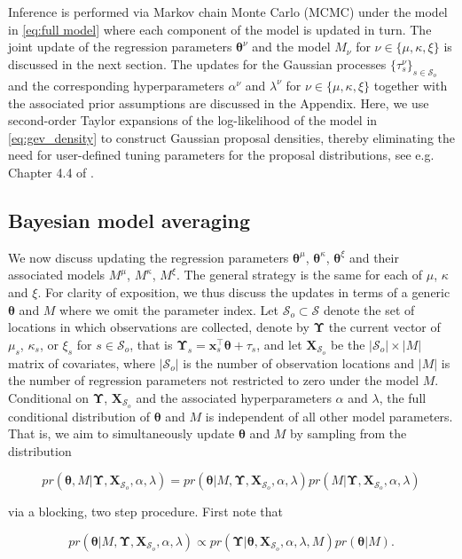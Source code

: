 \documentclass[11pt,english]{article}
\newcommand{\bs}[1]{\boldsymbol{#1}}
\newcommand{\mc}[1]{\mathcal{#1}}
\newcommand{\bl}{\begin{linenomath}}
\newcommand{\el}{\end{linenomath}}
\begin{document}
Inference is performed via Markov chain Monte Carlo (MCMC) under the model in \eqref{eq:full model} where each component of the model is updated in turn.  The joint update of the regression parameters $\bs{\theta}^\nu$ and the model $M_\nu$ for $\nu \in \{ \mu, \kappa, \xi\}$ is discussed in the next section.  The updates for the Gaussian processes $\{ \tau^\nu_s\}_{s \in \mathcal{S}_o}$ and the corresponding hyperparameters $\alpha^{\nu}$ and $\lambda^{\nu}$ for $\nu \in \{ \mu, \kappa, \xi\}$ together with the associated prior assumptions are discussed in the Appendix.  Here, we use second-order Taylor expansions of the log-likelihood of the model in \eqref{eq:gev_density} to construct Gaussian proposal densities, thereby eliminating the need for user-defined tuning parameters for the proposal distributions, see e.g. Chapter 4.4 of \cite{RueHeld2005}.  

\subsection{Bayesian model averaging}\label{sec:bma}

We now discuss updating the regression parameters $\bs{\theta}^{\mu}$, $\bs{\theta}^\kappa$, $\bs{\theta}^{\xi}$ and their associated models $M^\mu$, $M^\kappa$, $M^\xi$.  The general strategy is the same for each of $\mu$, $\kappa$ and $\xi$.  For clarity of exposition, we thus discuss the updates in terms of a generic $\bs{\theta}$ and $M$ where we omit the parameter index.  Let $\mc{S}_o\subset \mc{S}$ denote the set of locations in which observations are collected, denote by $\bs{\Upsilon}$ the current vector of $\mu_s$, $\kappa_s$, or $\xi_s$ for $s \in \mc{S}_o$, that is $\bs{\Upsilon}_s =  \bs{x}_s^\top \bs{\theta} + \tau_s $, and let $\bs{X}_{\mc{S}_o}$ be the $|\mc{S}_o| \times |M|$ matrix of covariates, where $|\mc{S}_o|$ is the number of observation locations and $|M|$ is the number of regression parameters not restricted to zero under the model $M$.   Conditional on $\bs{\Upsilon}$, $\bs{X}_{\mc{S}_o}$ and the associated hyperparameters $\alpha$ and $\lambda$, the full conditional distribution of $\bs{\theta}$ and $M$ is independent of all other model parameters. That is, we aim to simultaneously update $\bs{\theta}$ and $M$ by sampling from the distribution
\bl\[
pr(\bs{\theta}, M| \bs{\Upsilon}, \bs{X}_{\mc{S}_o}, \alpha, \lambda) = pr(\bs{\theta}|M, \bs{\Upsilon}, \bs{X}_{\mc{S}_o}, \alpha, \lambda) pr(M|\bs{\Upsilon}, \bs{X}_{\mc{S}_o}, \alpha, \lambda)
\]\el
via a blocking, two step procedure.  First note that
\bl\[
pr(\bs{\theta}|M, \bs{\Upsilon}, \bs{X}_{\mc{S}_o}, \alpha, \lambda) \propto pr(\bs{\Upsilon}|\bs{\theta},\bs{X}_{\mc{S}_o}, \alpha, \lambda, M)pr(\bs{\theta}|M).
\]\el
\end{document}
